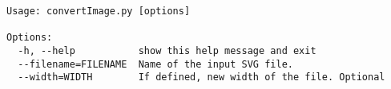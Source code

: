 \begin{verbatim}
Usage: convertImage.py [options]

Options:
  -h, --help           show this help message and exit
  --filename=FILENAME  Name of the input SVG file.
  --width=WIDTH        If defined, new width of the file. Optional
\end{verbatim}